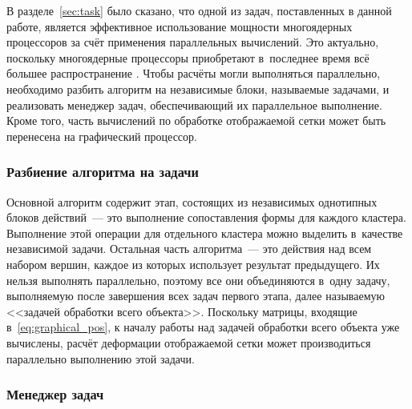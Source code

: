 \documentclass[a4paper, 14pt, titlepage]{extarticle}
\begin{document}
      В разделе~\ref{sec:task} было сказано, что одной из задач, поставленных в данной работе, является эффективное использование
      мощности многоядерных процессоров за счёт применения параллельных вычислений.
      Это актуально, поскольку многоядерные процессоры
      приобретают в~последнее время всё большее распространение \cite{steam-hardware}.
      Чтобы расчёты могли выполняться параллельно, необходимо разбить алгоритм на независимые
      блоки, называемые задачами, и реализовать менеджер задач, обеспечивающий их параллельное
      выполнение. Кроме того, часть вычислений по обработке отображаемой сетки может быть перенесена
      на графический процессор.

      \subsubsection{Разбиение алгоритма на задачи}\label{sssec:parallel_tasks}

        Основной алгоритм содержит этап, состоящих из независимых однотипных блоков
        действий~--- это выполнение сопоставления формы для каждого кластера. Выполнение этой
        операции для отдельного кластера можно выделить в~качестве независимой задачи. Остальная
        часть алгоритма~--- это действия над всем набором вершин, каждое из которых использует
        результат предыдущего. Их нельзя выполнять параллельно, поэтому все они объединяются в~одну
        задачу, выполняемую после завершения всех задач первого этапа, далее называемую <<задачей
        обработки всего объекта>>. Поскольку матрицы, входящие
        в~\eqref{eq:graphical_pos}, к началу работы над задачей обработки всего объекта уже вычислены,
        расчёт деформации отображаемой сетки может производиться параллельно выполнению этой задачи.

      \subsubsection{Менеджер задач}\label{sssec:task_manager}
\end{document}
